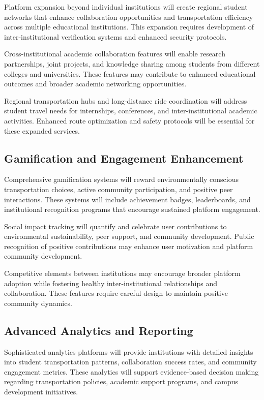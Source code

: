 \documentclass[conference]{IEEEtran}
\begin{document}
Platform expansion beyond individual institutions will create regional student networks that enhance collaboration opportunities and transportation efficiency across multiple educational institutions. This expansion requires development of inter-institutional verification systems and enhanced security protocols.

Cross-institutional academic collaboration features will enable research partnerships, joint projects, and knowledge sharing among students from different colleges and universities. These features may contribute to enhanced educational outcomes and broader academic networking opportunities.

Regional transportation hubs and long-distance ride coordination will address student travel needs for internships, conferences, and inter-institutional academic activities. Enhanced route optimization and safety protocols will be essential for these expanded services.

\subsection{Gamification and Engagement Enhancement}

Comprehensive gamification systems will reward environmentally conscious transportation choices, active community participation, and positive peer interactions. These systems will include achievement badges, leaderboards, and institutional recognition programs that encourage sustained platform engagement.

Social impact tracking will quantify and celebrate user contributions to environmental sustainability, peer support, and community development. Public recognition of positive contributions may enhance user motivation and platform community development.

Competitive elements between institutions may encourage broader platform adoption while fostering healthy inter-institutional relationships and collaboration. These features require careful design to maintain positive community dynamics.

\subsection{Advanced Analytics and Reporting}

Sophisticated analytics platforms will provide institutions with detailed insights into student transportation patterns, collaboration success rates, and community engagement metrics. These analytics will support evidence-based decision making regarding transportation policies, academic support programs, and campus development initiatives.
\end{document}
